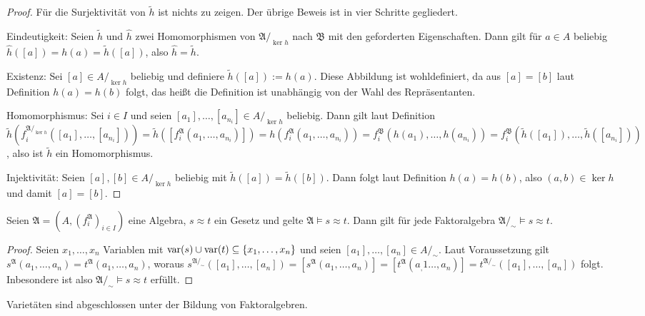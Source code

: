 \begin{proof}
    Für die Surjektivität von $\tilde{h}$ ist nichts zu zeigen. Der übrige Beweis ist in vier Schritte gegliedert.

    Eindeutigkeit: Seien $\tilde{h}$ und $\hat{h}$ zwei Homomorphismen von $\mathfrak{A}/_{\ker h}$ nach $\mathfrak{B}$ mit den geforderten Eigenschaften.
    Dann gilt für $a\in A$ beliebig $\hat{h}([a])=h(a)=\tilde{h}([a])$, also $\hat{h}=\tilde{h}$.

    Existenz: Sei $[a]\in A/_{\ker h}$ beliebig und definiere $\tilde{h}([a]):=h(a)$. Diese Abbildung ist wohldefiniert,
    da aus $[a]=[b]$ laut Definition $h(a)=h(b)$ folgt, das heißt die Definition ist unabhängig von der Wahl des Repräsentanten.

    Homomorphismus: Sei $i\in I$ und seien $[a_1],\ldots,[a_{n_i}]\in A/_{\ker h}$ beliebig. Dann gilt laut Definition
    $\tilde{h}(f^{\mathfrak{A}/_{\ker h}}_i([a_1],\ldots,[a_{n_i}]))=\tilde{h}([f^\mathfrak{A}_i(a_1,\ldots,a_{n_i})])=h(f^\mathfrak{A}_i(a_1,\ldots,a_{n_i}))=f^\mathfrak{B}_i(h(a_1),\ldots,h(a_{n_i}))=f^\mathfrak{B}_i(\tilde{h}([a_1]),\ldots,\tilde{h}([a_{n_i}]))$,
    also ist $\tilde{h}$ ein Homomorphismus.

    Injektivität: Seien $[a],[b]\in A/_{\ker h}$ beliebig mit $\tilde{h}([a])=\tilde{h}([b])$. Dann folgt laut Definition
    $h(a)=h(b)$, also $(a,b)\in\ker h$ und damit $[a]=[b]$.
\end{proof}

\begin{proposition}
    Seien $\mathfrak{A}=(A,(f^\mathfrak{A}_i)_{i\in I})$ eine Algebra, $s\approx t$ ein Gesetz und gelte $\mathfrak{A}\models s\approx t$.
    Dann gilt für jede Faktoralgebra $\mathfrak{A}/_\sim\models s\approx t$.
\end{proposition}

\begin{proof}
    Seien $x_1,\ldots,x_n$ Variablen mit $\operatorname{var}(s)\cup\operatorname{var}(t)\subseteq\{x_1,\ldots,x_n\}$ und seien
    $[a_1],\ldots,[a_n] \in A/_\sim$. Laut Voraussetzung gilt $s^\mathfrak{A}(a_1,\ldots,a_n)=t^\mathfrak{A}(a_1,\ldots,a_n)$, woraus
    $s^{\mathfrak{A}/_\sim}([a_1],\ldots,[a_n])=[s^\mathfrak{A}(a_1,\ldots,a_n)]=[t^\mathfrak{A}(a_,1\ldots,a_n)]=t^{\mathfrak{A}/_\sim}([a_1],\ldots,[a_n])$ folgt.
    Inbesondere ist also $\mathfrak{A}/_\sim\models s\approx t$ erfüllt.
\end{proof}

\begin{corollary}\label{corollary:fak-varietaeten}
    Varietäten sind abgeschlossen unter der Bildung von Faktoralgebren.
\end{corollary}

